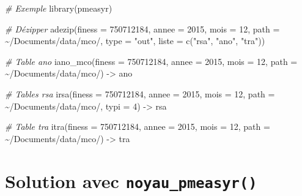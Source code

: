 \documentclass[
]{book}
\newenvironment{Shaded}{\begin{snugshade}}{\end{snugshade}}
\newcommand{\AttributeTok}[1]{\textcolor[rgb]{0.77,0.63,0.00}{#1}}
\newcommand{\CommentTok}[1]{\textcolor[rgb]{0.56,0.35,0.01}{\textit{#1}}}
\newcommand{\DecValTok}[1]{\textcolor[rgb]{0.00,0.00,0.81}{#1}}
\newcommand{\FunctionTok}[1]{\textcolor[rgb]{0.00,0.00,0.00}{#1}}
\newcommand{\NormalTok}[1]{#1}
\newcommand{\OtherTok}[1]{\textcolor[rgb]{0.56,0.35,0.01}{#1}}
\newcommand{\StringTok}[1]{\textcolor[rgb]{0.31,0.60,0.02}{#1}}
\begin{document}
\begin{Shaded}
\begin{Highlighting}[]
\CommentTok{\# Exemple}
\FunctionTok{library}\NormalTok{(pmeasyr)}

\CommentTok{\# Dézipper}
\FunctionTok{adezip}\NormalTok{(}\AttributeTok{finess =} \StringTok{\textquotesingle{}750712184\textquotesingle{}}\NormalTok{, }
       \AttributeTok{annee  =} \DecValTok{2015}\NormalTok{, }
       \AttributeTok{mois   =} \DecValTok{12}\NormalTok{, }
       \AttributeTok{path   =} \StringTok{\textquotesingle{}\textasciitilde{}/Documents/data/mco/\textquotesingle{}}\NormalTok{,}
       \AttributeTok{type   =} \StringTok{"out"}\NormalTok{, }
       \AttributeTok{liste  =} \FunctionTok{c}\NormalTok{(}\StringTok{"rsa"}\NormalTok{, }\StringTok{"ano"}\NormalTok{, }\StringTok{"tra"}\NormalTok{))}

\CommentTok{\# Table ano}
\FunctionTok{iano\_mco}\NormalTok{(}\AttributeTok{finess =} \StringTok{\textquotesingle{}750712184\textquotesingle{}}\NormalTok{, }
         \AttributeTok{annee  =} \DecValTok{2015}\NormalTok{, }
         \AttributeTok{mois   =} \DecValTok{12}\NormalTok{, }
         \AttributeTok{path   =} \StringTok{\textquotesingle{}\textasciitilde{}/Documents/data/mco/\textquotesingle{}}\NormalTok{) }\OtherTok{{-}\textgreater{}}\NormalTok{ ano}

\CommentTok{\# Tables rsa}
\FunctionTok{irsa}\NormalTok{(}\AttributeTok{finess =} \StringTok{\textquotesingle{}750712184\textquotesingle{}}\NormalTok{, }
     \AttributeTok{annee  =} \DecValTok{2015}\NormalTok{, }
     \AttributeTok{mois   =} \DecValTok{12}\NormalTok{, }
     \AttributeTok{path   =} \StringTok{\textquotesingle{}\textasciitilde{}/Documents/data/mco/\textquotesingle{}}\NormalTok{, }
     \AttributeTok{typi   =} \DecValTok{4}\NormalTok{) }\OtherTok{{-}\textgreater{}}\NormalTok{ rsa}

\CommentTok{\# Table tra}
\FunctionTok{itra}\NormalTok{(}\AttributeTok{finess =} \StringTok{\textquotesingle{}750712184\textquotesingle{}}\NormalTok{, }
     \AttributeTok{annee  =} \DecValTok{2015}\NormalTok{, }
     \AttributeTok{mois   =} \DecValTok{12}\NormalTok{, }
     \AttributeTok{path   =} \StringTok{\textquotesingle{}\textasciitilde{}/Documents/data/mco/\textquotesingle{}}\NormalTok{) }\OtherTok{{-}\textgreater{}}\NormalTok{ tra}
\end{Highlighting}
\end{Shaded}

\hypertarget{solution-avec-noyau_pmeasyr}{%
\section{\texorpdfstring{Solution avec \texttt{noyau\_pmeasyr()}}{Solution avec noyau\_pmeasyr()}}\label{solution-avec-noyau_pmeasyr}}
\end{document}
